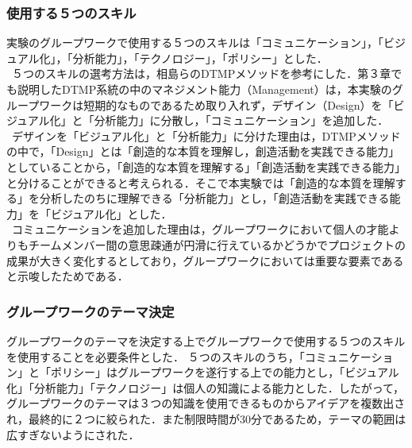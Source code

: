 \documentclass{funthesis}
\begin{document}
\subsubsection{使用する５つのスキル}
実験のグループワークで使用する５つのスキルは「コミュニケーション」，「ビジュアル化」，「分析能力」，「テクノロジー」，「ポリシー」とした．\\
\ ５つのスキルの選考方法は，相島ら\cite{A5}のDTMPメソッドを参考にした．第３章でも説明したDTMP系統の中のマネジメント能力（Management）は，本実験のグループワークは短期的なものであるため取り入れず，デザイン（Design）を「ビジュアル化」と「分析能力」に分散し，「コミュニケーション」を追加した．\\
\ デザインを「ビジュアル化」と「分析能力」に分けた理由は，DTMPメソッドの中で，「Design」とは「創造的な本質を理解し，創造活動を実践できる能力」としていることから，「創造的な本質を理解する」「創造活動を実践できる能力」と分けることができると考えられる．そこで本実験では「創造的な本質を理解する」を分析したのちに理解できる「分析能力」とし，「創造活動を実践できる能力」を「ビジュアル化」とした．\\
\ コミュニケーションを追加した理由は，グループワークにおいて個人の才能よりもチームメンバー間の意思疎通が円滑に行えているかどうかでプロジェクトの成果が大きく変化する\cite{A6}としており，グループワークにおいては重要な要素であると示唆したためである．


\subsubsection{グループワークのテーマ決定}
グループワークのテーマを決定する上でグループワークで使用する５つのスキルを使用することを必要条件とした．
５つのスキルのうち，「コミュニケーション」と「ポリシー」はグループワークを遂行する上での能力とし，「ビジュアル化」「分析能力」「テクノロジー」は個人の知識による能力とした．したがって，グループワークのテーマは３つの知識を使用できるものからアイデアを複数出され，最終的に２つに絞られた．また制限時間が30分であるため，テーマの範囲は広すぎないようにされた．
\end{document}

